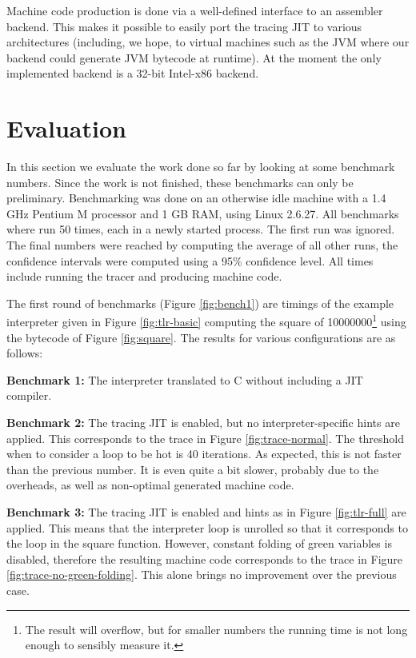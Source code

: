 \documentclass{sig-alternate}
\begin{document}
Machine code production is done via a well-defined interface to an assembler
backend. This makes it possible to easily port the tracing JIT to various
architectures (including, we hope, to virtual machines such as the JVM where
our backend could generate JVM bytecode at runtime). At the moment the only
implemented backend is a 32-bit Intel-x86 backend.


\section{Evaluation}
\label{sect:evaluation}

In this section we evaluate the work done so far by looking at some
benchmark numbers. Since the work is not finished, these benchmarks can only be
preliminary. Benchmarking was done on an otherwise idle machine with a 1.4
GHz Pentium M processor and 1 GB RAM, using Linux 2.6.27. All benchmarks where
run 50 times, each in a newly started process. The first run was ignored. The
final numbers were reached by computing the average of all other runs, the
confidence intervals were computed using a 95\% confidence level. All times
include running the tracer and producing machine code.

The first round of benchmarks (Figure \ref{fig:bench1}) are timings of the
example interpreter given in Figure \ref{fig:tlr-basic} computing
the square of 10000000\footnote{The result will overflow, but for smaller numbers the
running time is not long enough to sensibly measure it.}
using the bytecode of Figure \ref{fig:square}. The results for various
configurations are as follows:

\textbf{Benchmark 1:} The interpreter translated to C without including a JIT
compiler.

\textbf{Benchmark 2:} The tracing JIT is enabled, but no inter\-preter-specific
hints are applied. This corresponds to the trace in Figure
\ref{fig:trace-normal}.  The threshold when to consider a loop to be hot is 40
iterations.  As expected, this is not faster than the previous number. It is
even quite a bit slower, probably due to the overheads, as well as
non-optimal generated machine code.

\textbf{Benchmark 3:} The tracing JIT is enabled and hints as in Figure
\ref{fig:tlr-full} are applied. This means that the interpreter loop is unrolled
so that it corresponds to the loop in the square function. However, constant folding of green
variables is disabled, therefore the resulting machine code corresponds to the
trace in Figure \ref{fig:trace-no-green-folding}. This alone brings no
improvement over the previous case.
\end{document}

